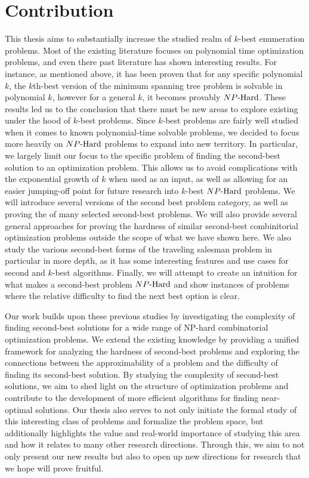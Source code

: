 \section{Contribution}
This thesis aims to substantially increase the studied realm of $k$-best enumeration problems. Most of the existing literature focuses on polynomial time optimization problems, and even there past literature has shown interesting results. For instance, as mentioned above, it has been proven that for any specific polynomial $k$, the $k$th-best version of the minimum spanning tree problem is solvable in polynomial $k$, however for a general $k$, it becomes provably ${NP\text{-Hard{}}}$. These results led us to the conclusion that there must be new areas to explore existing under the hood of $k$-best problems. Since $k$-best problems are fairly well studied when it comes to known polynomial-time solvable problems, we decided to focus more heavily on ${NP\text{-Hard{}}}$ problems to expand into new territory. In particular, we largely limit our focus to the specific problem of finding the second-best solution to an optimization problem. This allows us to avoid complications with the exponential growth of $k$ when used as an input, as well as allowing for an easier jumping-off point for future research into $k$-best ${NP\text{-Hard{}}}$ problems. We will introduce several versions of the second best problem category, as well as proving the  of many selected second-best problems. We will also provide several general approaches for proving the hardness of similar second-best combinitorial optimization problems outside the scope of what we have shown here. We also study the various second-best forms of the traveling salesman problem in particular in more depth, as it has some interesting features and use cases for second and $k$-best algorithms. Finally, we will attempt to create an intuition for what makes a second-best problem ${NP\text{-Hard{}}}$ and show instances of problems where the relative difficulty to find the next best option is clear.

Our work builds upon these previous studies by investigating the complexity of finding second-best solutions for a wide range of NP-hard combinatorial optimization problems. We extend the existing knowledge by providing a unified framework for analyzing the hardness of second-best problems and exploring the connections between the approximability of a problem and the difficulty of finding its second-best solution. By studying the complexity of second-best solutions, we aim to shed light on the structure of optimization problems and contribute to the development of more efficient algorithms for finding near-optimal solutions. Our thesis also serves to not only initiate the formal study of this interesting class of problems and formalize the problem space, but additionally highlights the value and real-world importance of studying this area and how it relates to many other research directions. Through this, we aim to not only present our new results but also to open up new directions for research that we hope will prove fruitful.